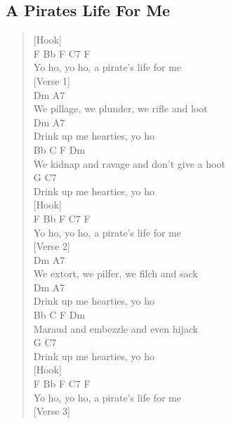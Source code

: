 \documentclass[11pt]{article}
\begin{document}
\subsection{A Pirates Life For Me}
\label{sec:org58337f5}
\begin{verse}
[Hook]\\
F      Bb       F        C7        F\\
Yo ho, yo ho, a pirate's life for me\\
\vspace*{1em}
[Verse 1]\\
\hspace*{3em}Dm                      A7\\
We pillage, we plunder, we rifle and loot\\
Dm                       A7\\
Drink up me hearties, yo ho\\
\hspace*{3em}Bb         C          F            Dm\\
We kidnap and ravage and don't give a hoot\\
\hspace*{6em}G               C7\\
Drink up me hearties, yo ho\\
\vspace*{1em}
[Hook]\\
F      Bb       F        C7        F\\
Yo ho, yo ho, a pirate's life for me\\
\vspace*{1em}
[Verse 2]\\
Dm                       A7\\
We extort, we pilfer, we filch and sack\\
Dm                    A7\\
Drink up me hearties, yo ho\\
Bb         C            F      Dm\\
Maraud and embezzle and even hijack\\
G                       C7\\
Drink up me hearties, yo ho\\
\vspace*{1em}
[Hook]\\
F      Bb       F        C7        F\\
Yo ho, yo ho, a pirate's life for me\\
\vspace*{1em}
[Verse 3]\\

\end{verse}
\end{document}
